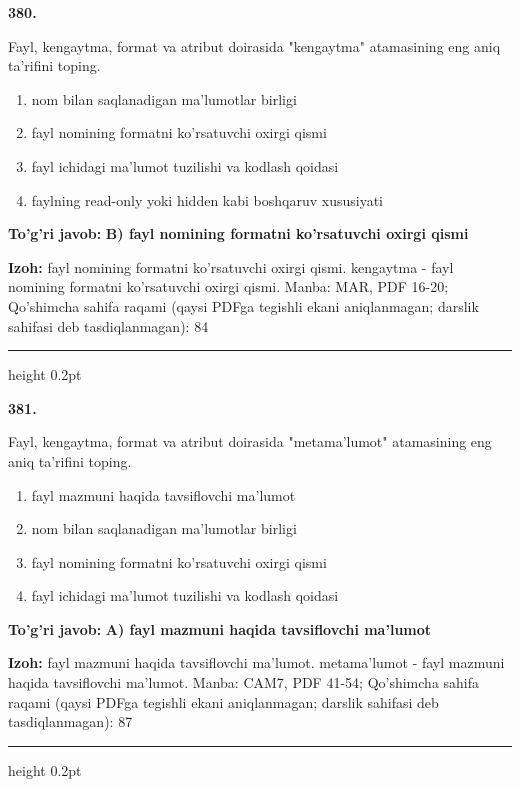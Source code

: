 \documentclass[10pt,a4paper]{article}
\begin{document}
{\bfseries\sffamily\color{ink} 380.}
\par
Fayl, kengaytma, format va atribut doirasida "kengaytma" atamasining eng aniq ta'rifini toping.
\begin{enumerate}[label=\Alph*),leftmargin=9mm]
\item nom bilan saqlanadigan ma'lumotlar birligi
\item fayl nomining formatni ko'rsatuvchi oxirgi qismi
\item fayl ichidagi ma'lumot tuzilishi va kodlash qoidasi
\item faylning read-only yoki hidden kabi boshqaruv xususiyati
\end{enumerate}
\begin{tcolorbox}[enhanced,breakable,colback=teal!4,colframe=teal!60!black,boxrule=0.45pt,arc=1.2mm,left=2.7mm,right=2.7mm,top=1.8mm,bottom=1.8mm,before skip=2mm,after skip=2mm]
{\bfseries\sffamily\color{teal}To'g'ri javob:} \textbf{B) fayl nomining formatni ko'rsatuvchi oxirgi qismi}
\par\smallskip
{\bfseries Izoh:} fayl nomining formatni ko'rsatuvchi oxirgi qismi. kengaytma - fayl nomining formatni ko'rsatuvchi oxirgi qismi. Manba: MAR, PDF 16-20; Qo'shimcha sahifa raqami (qaysi PDFga tegishli ekani aniqlanmagan; darslik sahifasi deb tasdiqlanmagan): 84
\end{tcolorbox}
\vspace{2mm}\hrule height 0.2pt\vspace{3mm}

{\bfseries\sffamily\color{ink} 381.}
\par
Fayl, kengaytma, format va atribut doirasida "metama'lumot" atamasining eng aniq ta'rifini toping.
\begin{enumerate}[label=\Alph*),leftmargin=9mm]
\item fayl mazmuni haqida tavsiflovchi ma'lumot
\item nom bilan saqlanadigan ma'lumotlar birligi
\item fayl nomining formatni ko'rsatuvchi oxirgi qismi
\item fayl ichidagi ma'lumot tuzilishi va kodlash qoidasi
\end{enumerate}
\begin{tcolorbox}[enhanced,breakable,colback=teal!4,colframe=teal!60!black,boxrule=0.45pt,arc=1.2mm,left=2.7mm,right=2.7mm,top=1.8mm,bottom=1.8mm,before skip=2mm,after skip=2mm]
{\bfseries\sffamily\color{teal}To'g'ri javob:} \textbf{A) fayl mazmuni haqida tavsiflovchi ma'lumot}
\par\smallskip
{\bfseries Izoh:} fayl mazmuni haqida tavsiflovchi ma'lumot. metama'lumot - fayl mazmuni haqida tavsiflovchi ma'lumot. Manba: CAM7, PDF 41-54; Qo'shimcha sahifa raqami (qaysi PDFga tegishli ekani aniqlanmagan; darslik sahifasi deb tasdiqlanmagan): 87
\end{tcolorbox}
\vspace{2mm}\hrule height 0.2pt\vspace{3mm}
\end{document}
